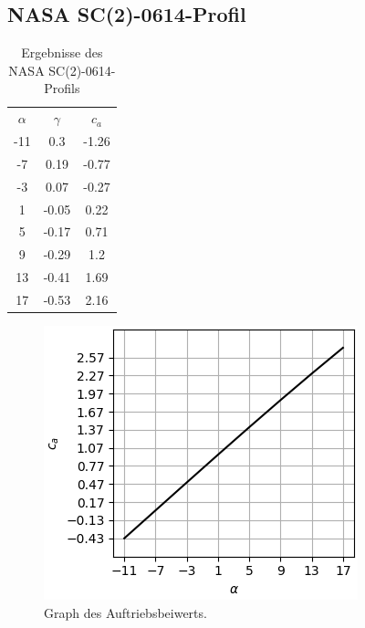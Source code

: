 \subsection{NASA SC(2)-0614-Profil}
\begin{minipage}{0.45\textwidth}
\begin{table}[H]
    \centering
    \begin{tabular}{c|cc}
    $\alpha$ & $\gamma$ & $c_a$ \\
        -11 & 0.3 & -1.26 \\ 
-7 & 0.19 & -0.77 \\ 
-3 & 0.07 & -0.27 \\ 
1 & -0.05 & 0.22 \\ 
5 & -0.17 & 0.71 \\ 
9 & -0.29 & 1.2 \\ 
13 & -0.41 & 1.69 \\ 
17 & -0.53 & 2.16 \\ 

    \end{tabular}
    \label{tab:nlf}
    \caption{Ergebnisse des NASA SC(2)-0614-Profils}
\end{table}
\end{minipage}
\hfill
\begin{minipage}{0.45\textwidth}
\begin{figure}[H]
    \centering
    \includegraphics[scale=0.6]{figures/nlf105ca.png}
    \caption{Graph des Auftriebsbeiwerts.}
    \label{fig:nlfca}
\end{figure}
\end{minipage}

